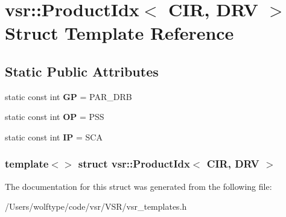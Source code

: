 \hypertarget{structvsr_1_1_product_idx_3_01_c_i_r_00_01_d_r_v_01_4}{\section{vsr\-:\-:Product\-Idx$<$ C\-I\-R, D\-R\-V $>$ Struct Template Reference}
\label{structvsr_1_1_product_idx_3_01_c_i_r_00_01_d_r_v_01_4}
}
\subsection*{Static Public Attributes}
\begin{DoxyCompactItemize}
\item 
\hypertarget{structvsr_1_1_product_idx_3_01_c_i_r_00_01_d_r_v_01_4_a5e210e27607c392dfba84764422f5794}{static const int {\bfseries G\-P} = P\-A\-R\-\_\-\-D\-R\-B}\label{structvsr_1_1_product_idx_3_01_c_i_r_00_01_d_r_v_01_4_a5e210e27607c392dfba84764422f5794}

\item 
\hypertarget{structvsr_1_1_product_idx_3_01_c_i_r_00_01_d_r_v_01_4_a0c12465e78f488c9a12aef2727ebbd83}{static const int {\bfseries O\-P} = P\-S\-S}\label{structvsr_1_1_product_idx_3_01_c_i_r_00_01_d_r_v_01_4_a0c12465e78f488c9a12aef2727ebbd83}

\item 
\hypertarget{structvsr_1_1_product_idx_3_01_c_i_r_00_01_d_r_v_01_4_a61800edb3949814fde8126af411d5e83}{static const int {\bfseries I\-P} = S\-C\-A}\label{structvsr_1_1_product_idx_3_01_c_i_r_00_01_d_r_v_01_4_a61800edb3949814fde8126af411d5e83}

\end{DoxyCompactItemize}
\subsubsection*{template$<$$>$ struct vsr\-::\-Product\-Idx$<$ C\-I\-R, D\-R\-V $>$}



The documentation for this struct was generated from the following file\-:\begin{DoxyCompactItemize}
\item 
/\-Users/wolftype/code/vsr/\-V\-S\-R/vsr\-\_\-templates.\-h\end{DoxyCompactItemize}
